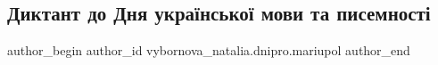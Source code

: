  
 
 
 
 

\subsection{Диктант до Дня української мови та писемності}
\label{sec:09_11_2022.fb.vybornova_natalia.dnipro.mariupol.1.diktant_do_dnya_ukra}

\ifcmt
 author_begin
   author_id vybornova_natalia.dnipro.mariupol
 author_end
\fi
